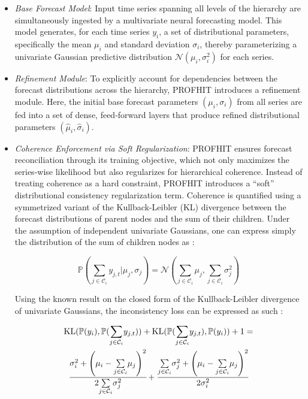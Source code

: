 \documentclass[letterpaper]{article}
\begin{document}
\begin{itemize}

    \item \textit{Base Forecast Model}: Input time series spanning all levels of the hierarchy are simultaneously ingested by a multivariate neural forecasting model. 
    This model generates, for each time series $y_i$, a set of distributional parameters, specifically the mean $ \mu_i $ and standard deviation $ \sigma_i $, thereby parameterizing a univariate Gaussian predictive distribution $\mathcal{N}(\mu_i, \sigma_i^2)$ for each series.

    \item \textit{Refinement Module}: To explicitly account for dependencies between the forecast distributions across the hierarchy, PROFHIT introduces a refinement module. 
    Here, the initial base forecast parameters $(\mu_i, \sigma_i)$ from all series are fed into a set of dense, feed-forward layers that produce refined distributional parameters $( \hat{\mu}_i, \hat{\sigma}_i )$.

    \item \textit{Coherence Enforcement via Soft Regularization}: PROFHIT ensures forecast reconciliation through its training objective, which not only maximizes the series-wise likelihood but also regularizes for hierarchical coherence. 
    Instead of treating coherence as a hard constraint, PROFHIT introduces a “soft” distributional consistency regularization term. 
    Coherence is quantified using a symmetrized variant of the Kullback-Leibler (KL) divergence between the forecast distributions of parent nodes and the sum of their children. 
    Under the assumption of independent univariate Gaussians, one can express simply the distribution of the sum of children nodes as :
    
    \begin{equation}
     \mathbb{P}(\underset{j\in \mathcal{C}_i}{\sum}y_{j,t}| \mu_j , \sigma_j) =  \mathcal{N}(\underset{j\in \mathcal{C}_i}{\sum}\mu_j, { \underset{j\in \mathcal{C}_i}{\sum}\sigma^2_j})
    \end{equation}

    Using the known result on the closed form of the Kullback-Leibler divergence of univariate Gaussians, the inconsistency loss can be expressed as such :

  
    \begin{multline} 
    \mathrm{KL}(\mathbb{P}(y_i),\mathbb{P}(\underset{j\in \mathcal{C}_i} {\sum}y_{j,t})) + \mathrm{KL}(\mathbb{P}(\underset{j\in \mathcal{C}_i} {\sum}y_{j,t}),\mathbb{P}(y_i))+ 1 = \\ \cfrac{\sigma_i^2 + \left(\mu_i - \underset{j\in \mathcal{C}_i}{\sum}\mu_j \right)^2}{2{\underset{j\in \mathcal{C}_i}{\sum}\sigma^2_j}} + \cfrac{\underset{j\in \mathcal{C}_i}{\sum}\sigma^2_j + \left(\mu_i - \underset{j\in \mathcal{C}_i}{\sum}\mu_j \right)^2 }{2\sigma_i^2}
    \end{multline}

\end{itemize}
\end{document}
